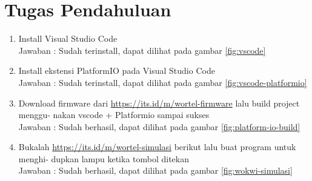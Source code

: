 \section*{Tugas Pendahuluan}
\begin{enumerate}
  \item Install Visual Studio Code \\
  Jawaban : Sudah terinstall, dapat dilihat pada gambar \ref{fig:vscode}
  \item Install ekstensi PlatformIO pada Visual Studio Code \\
  Jawaban : Sudah terinstall, dapat dilihat pada gambar \ref{fig:vscode-platformio}
  \item Download firmware dari \href{https://its.id/m/wortel-firmware}{https://its.id/m/wortel-firmware} lalu build project menggu-
  nakan vscode + Platformio sampai sukses \\
  Jawaban : Sudah berhasil, dapat dilihat pada gambar \ref{fig:platform-io-build}
  \item Bukalah \href{https://its.id/m/wortel-simulasi}{https://its.id/m/wortel-simulasi} berikut lalu buat program untuk menghi-
  dupkan lampu ketika tombol ditekan \\
  Jawaban : Sudah berhasil, dapat dilihat pada gambar \ref{fig:wokwi-simulasi}
\end{enumerate}